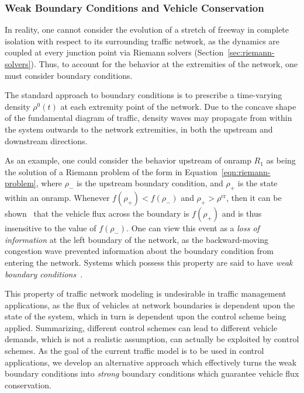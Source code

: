 \subsubsection{Weak Boundary Conditions and Vehicle Conservation}

In reality, one cannot consider the evolution of a stretch of freeway in complete isolation with respect to its surrounding traffic network, as the dynamics are coupled at every junction point via Riemann solvers (Section~\ref{sec:riemann-solvers}). Thus, to account for the behavior at the extremities of the network, one must consider boundary conditions.

The standard approach to boundary conditions is to prescribe a time-varying density $\rho^0\left(t\right)$ at each extremity point of the network. Due to the concave shape of the fundamental diagram of traffic, density waves may propagate from within the system outwards to the network extremities, in both the upstream and downstream directions.

As an example, one could consider the behavior upstream of onramp $R_1$ as being the solution of a Riemann problem of the form in Equation~\eqref{eqn:riemann-problem}, where $\rho_-$ is the upstream boundary condition, and $\rho_+$ is the state within an onramp. Whenever $f\left(\rho_+\right)<f\left(\rho_-\right)$ and $\rho_+ > \rho^{\text{cr}}$, then it can be shown~\cite{lebacque1996godunov,garavello2006traffic} that the vehicle flux across the boundary is $f\left(\rho_+\right)$ and is thus insensitive to the value of $f\left(\rho_-\right)$. One can view this event as a \emph{loss of information} at the left boundary of the network, as the backward-moving congestion wave prevented information about the boundary condition from entering the network. Systems which possess this property are said to have \emph{weak boundary conditions}~\cite{strub2006weak}.

This property of traffic network modeling is undesirable in traffic management applications, as the flux of vehicles at network boundaries is dependent upon the state of the system, which in turn is dependent upon the control scheme being applied. Summarizing, different control schemes can lead to different vehicle demands, which is not a realistic assumption, can actually be exploited by control schemes. As the goal of the current traffic model is to be used in control applications, we develop an alternative approach which effectively turns the weak boundary conditions into \emph{strong} boundary conditions which guarantee vehicle flux conservation.

